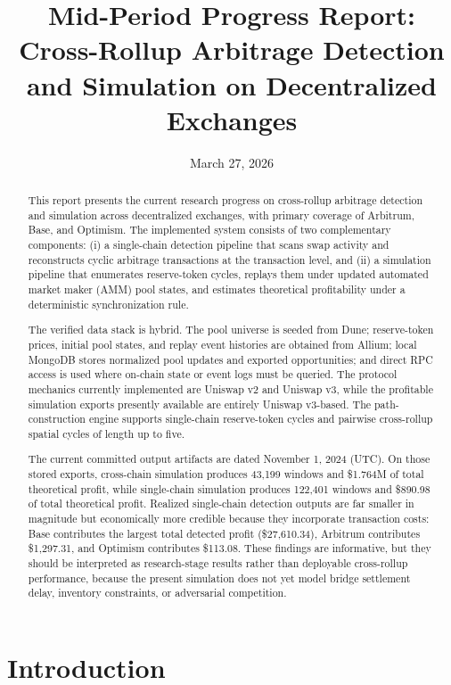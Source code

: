 \documentclass[11pt]{article}
\title{\textbf{Mid-Period Progress Report: Cross-Rollup Arbitrage Detection and Simulation on Decentralized Exchanges}}
\author{}
\date{March 27, 2026}
\begin{document}
\maketitle

\begin{abstract}
This report presents the current research progress on cross-rollup arbitrage detection and simulation across decentralized exchanges, with primary coverage of Arbitrum, Base, and Optimism. The implemented system consists of two complementary components: (i) a single-chain detection pipeline that scans swap activity and reconstructs cyclic arbitrage transactions at the transaction level, and (ii) a simulation pipeline that enumerates reserve-token cycles, replays them under updated automated market maker (AMM) pool states, and estimates theoretical profitability under a deterministic synchronization rule.

The verified data stack is hybrid. The pool universe is seeded from Dune; reserve-token prices, initial pool states, and replay event histories are obtained from Allium; local MongoDB stores normalized pool updates and exported opportunities; and direct RPC access is used where on-chain state or event logs must be queried. The protocol mechanics currently implemented are Uniswap v2 and Uniswap v3, while the profitable simulation exports presently available are entirely Uniswap v3-based. The path-construction engine supports single-chain reserve-token cycles and pairwise cross-rollup spatial cycles of length up to five.

The current committed output artifacts are dated November 1, 2024 (UTC). On those stored exports, cross-chain simulation produces 43{,}199 windows and \$1.764M of total theoretical profit, while single-chain simulation produces 122{,}401 windows and \$890.98 of total theoretical profit. Realized single-chain detection outputs are far smaller in magnitude but economically more credible because they incorporate transaction costs: Base contributes the largest total detected profit (\$27{,}610.34), Arbitrum contributes \$1{,}297.31, and Optimism contributes \$113.08. These findings are informative, but they should be interpreted as research-stage results rather than deployable cross-rollup performance, because the present simulation does not yet model bridge settlement delay, inventory constraints, or adversarial competition.
\end{abstract}

\section{Introduction}
\end{document}
